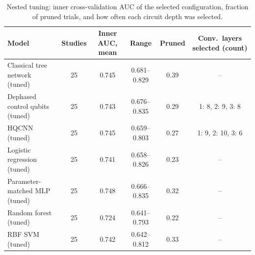 \begin{table}[tbp]
\centering
\caption{Nested tuning: inner cross-validation AUC of the selected configuration, fraction of pruned trials, and how often each circuit depth was selected.}
\label{tab:s_tuning}
\small
\begin{tabular}{lccccc}
\toprule
Model & Studies & Inner AUC, mean & Range & Pruned & Conv.\ layers selected (count) \\
\midrule
Classical tree network (tuned) & \num{25} & \num{0.745} & \num{0.681}--\num{0.829} & \num{0.39} & -- \\
Dephased control qubits (tuned) & \num{25} & \num{0.743} & \num{0.676}--\num{0.835} & \num{0.29} & \num{1}: \num{8}, \num{2}: \num{9}, \num{3}: \num{8} \\
HQCNN (tuned) & \num{25} & \num{0.745} & \num{0.659}--\num{0.803} & \num{0.27} & \num{1}: \num{9}, \num{2}: \num{10}, \num{3}: \num{6} \\
Logistic regression (tuned) & \num{25} & \num{0.741} & \num{0.658}--\num{0.826} & \num{0.23} & -- \\
Parameter-matched MLP (tuned) & \num{25} & \num{0.748} & \num{0.666}--\num{0.835} & \num{0.32} & -- \\
Random forest (tuned) & \num{25} & \num{0.724} & \num{0.641}--\num{0.793} & \num{0.22} & -- \\
RBF SVM (tuned) & \num{25} & \num{0.742} & \num{0.642}--\num{0.812} & \num{0.33} & -- \\
\bottomrule
\end{tabular}
\end{table}
